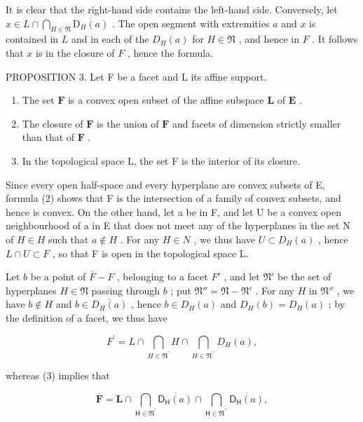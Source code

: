 It is clear that the right-hand side contains the left-hand side. Conversely, let \(x \in L \cap \bigcap_{H \in \mathfrak{N}} \overline{\mathrm{D}_H(a)}\) . The open segment with extremities \(a\) and \(x\) is contained in \(L\) and in each of the \(D_H(a)\) for \(H \in \mathfrak{N}\) , and hence in \(F\) . It follows that \(x\) is in the closure of \(F\) , hence the formula.

PROPOSITION 3. Let F be a facet and L its affine support.

\begin{enumerate}
\def\labelenumi{(\roman{enumi})}
\item
  The set \(\mathbf{F}\) is a convex open subset of the affine subspace \(\mathbf{L}\) of \(\mathbf{E}\) .
\item
  The closure of \(\mathbf{F}\) is the union of \(\mathbf{F}\) and facets of dimension strictly smaller than that of \(\mathbf{F}\) .
\item
  In the topological space L, the set F is the interior of its closure.
\end{enumerate}

Since every open half-space and every hyperplane are convex subsets of E, formula (2) shows that F is the intersection of a family of convex subsets, and hence is convex. On the other hand, let a be in F, and let U be a convex open neighbourhood of a in E that does not meet any of the hyperplanes in the set N of \(H \in H\) such that \(a \notin H\) . For any \(H \in N\) , we thus have \(U \subset D_{H}(a)\) , hence \(L \cap U \subset F\) , so that F is open in the topological space L.

Let \(b\) be a point of \(\overline{F} - F\) , belonging to a facet \(F'\) , and let \(\mathfrak{N}'\) be the set of hyperplanes \(H \in \mathfrak{N}\) passing through \(b\) ; put \(\mathfrak{N}'' = \mathfrak{N} - \mathfrak{N}'\) . For any \(H\) in \(\mathfrak{N}''\) , we have \(b \notin H\) and \(b \in \overline{D_H(a)}\) , hence \(b \in D_H(a)\) and \(D_H(b) = D_H(a)\) ; by the definition of a facet, we thus have

\[
F ^ {\prime} = L \cap \bigcap_ {H \in \mathfrak {N} ^ {\prime}} H \cap \bigcap_ {H \in \mathfrak {N} ^ {\prime \prime}} D _ {H} (a),\tag{4}
\]

whereas (3) implies that

\[
\overline {{\mathbf {F}}} = \mathbf {L} \cap \bigcap_ {\mathsf {H} \in \mathfrak {N} ^ {\prime}} \overline {{\mathsf {D} _ {\mathsf {H}} (a)}} \cap \bigcap_ {\mathsf {H} \in \mathfrak {N} ^ {\prime \prime}} \overline {{\mathsf {D} _ {\mathsf {H}} (a)}},\tag{5}
\]

